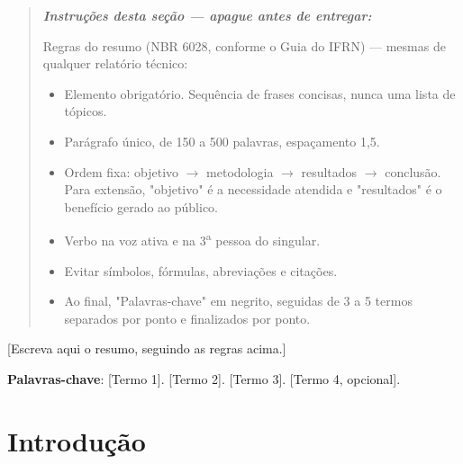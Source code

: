 \documentclass[article,12pt,a4paper]{abntex2}
\newenvironment{instrucoes}{%
  \begin{quotation}\footnotesize\itshape
  \noindent\textbf{\upshape Instruções desta seção — apague antes de entregar:}\par\smallskip
}{%
  \end{quotation}
}
\begin{document}
\maketitle

\begin{resumo}
\begin{instrucoes}
Regras do resumo (NBR 6028, conforme o Guia do IFRN) — mesmas de qualquer relatório técnico:
\begin{itemize}
  \item Elemento obrigatório. Sequência de frases concisas, nunca uma lista de tópicos.
  \item Parágrafo único, de 150 a 500 palavras, espaçamento 1,5.
  \item Ordem fixa: objetivo $\to$ metodologia $\to$ resultados $\to$ conclusão. Para extensão, "objetivo" é a necessidade atendida e "resultados" é o benefício gerado ao público.
  \item Verbo na voz ativa e na 3\textsuperscript{a} pessoa do singular.
  \item Evitar símbolos, fórmulas, abreviações e citações.
  \item Ao final, "Palavras-chave" em negrito, seguidas de 3 a 5 termos separados por ponto e finalizados por ponto.
\end{itemize}
\end{instrucoes}

[Escreva aqui o resumo, seguindo as regras acima.]

\vspace{\onelineskip}
\noindent
\textbf{Palavras-chave}: [Termo 1]. [Termo 2]. [Termo 3]. [Termo 4, opcional].
\end{resumo}

\textual

\section{Introdução}
\end{document}

